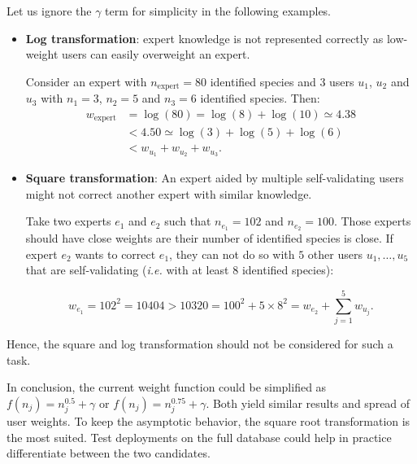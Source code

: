 \begin{constructionbox}
    Let us ignore the $\gamma$ term for simplicity in the following examples.
    \begin{itemize}
        \item \textbf{Log transformation}: expert knowledge is not represented correctly as low-weight users can easily overweight an expert.

        Consider an expert with $n_{\text{expert}}=80$ identified species and $3$ users $u_1$, $u_2$ and $u_3$ with $n_1=3$, $n_2=5$ and $n_3=6$ identified species. Then:
        \begin{align*}
            w_{\text{expert}} &= \log(80) = \log(8) + \log(10) \simeq 4.38 \\
            & < 4.50 \simeq \log(3) + \log(5) + \log(6) \\
            &< w_{u_1} + w_{u_2} + w_{u_3}.
        \end{align*}
        \item \textbf{Square transformation}: An expert aided by multiple self-validating users might not correct another expert with similar knowledge.

        Take two experts $e_1$ and $e_2$ such that $n_{e_1}=102$ and $n_{e_2}=100$. Those experts should have close weights are their number of identified species is close. If expert $e_2$ wants to correct $e_1$, they can not do so with $5$ other users $u_{1},\dots, u_{5}$ that are self-validating (\emph{i.e.} with at least $8$ identified species):

        \begin{equation*}
            w_{e_{1}} = 102^2 = 10404 > 10320 = 100^2 + 5\times 8^2 = w_{e_{2}} + \sum_{j=1}^5 w_{u_{j}}.
        \end{equation*}

    \end{itemize}

    Hence, the square and log transformation should not be considered for such a task.
\end{constructionbox}


In conclusion, the current weight function could be simplified as $f(n_j)=n_j^{0.5}+\gamma$ or $f(n_j)=n_j^{0.75}+\gamma$.
Both yield similar results and spread of user weights.
To keep the asymptotic behavior, the square root transformation is the most suited.
Test deployments on the full database could help in practice differentiate between the two candidates.

